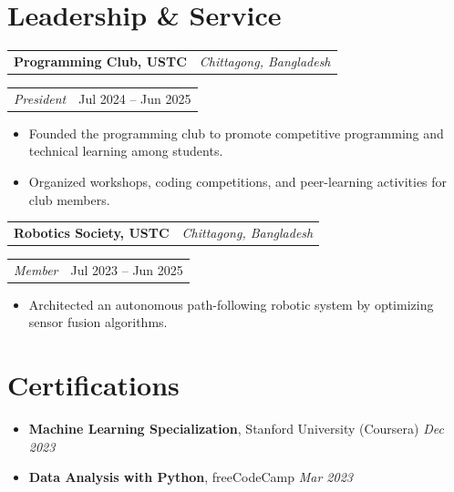 \documentclass[10pt]{article}
\makeatletter
\newcommand{\entry}[2]{%
  \noindent\begin{tabularx}{\linewidth}{@{}X r@{}}
    \textbf{#1} & \textit{\small #2}
  \end{tabularx}\vspace{-1pt}
}
\newcommand{\subentry}[2]{%
  \noindent\begin{tabularx}{\linewidth}{@{}X r@{}}
    \textit{\small #1} & {\small #2}
  \end{tabularx}\vspace{1pt}
}
\makeatother
\begin{document}
\section{Leadership \& Service}
\entry{Programming Club, USTC}{Chittagong, Bangladesh}
\subentry{President}{Jul 2024 -- Jun 2025}
\begin{itemize}
    \item Founded the programming club to promote competitive programming and technical learning among students.
    \item Organized workshops, coding competitions, and peer-learning activities for club members.
\end{itemize}
\vspace{4pt}

\entry{Robotics Society, USTC}{Chittagong, Bangladesh}
\subentry{Member}{Jul 2023 -- Jun 2025}
\begin{itemize}
  \item Architected an autonomous path-following robotic system by optimizing sensor fusion algorithms.
\end{itemize}


\section{Certifications}
\begin{itemize}
  \item \textbf{Machine Learning Specialization}, Stanford University (Coursera) \hfill \textit{Dec 2023}
  \item \textbf{Data Analysis with Python}, freeCodeCamp \hfill \textit{Mar 2023}
\end{itemize}
\end{document}

